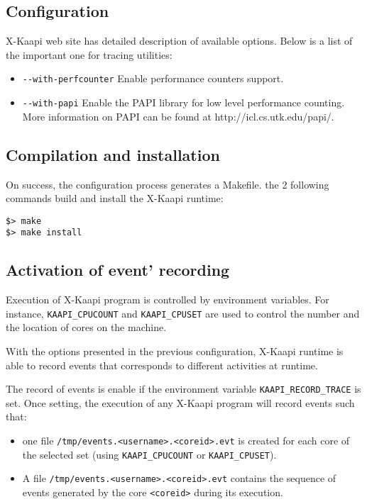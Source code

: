 \documentclass{article}[12pt]
\newcommand{\kaapi}{\textsc{X}-Kaapi\xspace}
\begin{document}
\subsection{Configuration}
\kaapi web site has detailed description of available options. 
Below is a list of the important one for tracing utilities:
\begin{itemize} %
\item \verb+--with-perfcounter+\newline
Enable performance counters support.
\item \verb+--with-papi+\newline
Enable the PAPI library for low level performance counting.
More information on PAPI can be found at http://icl.cs.utk.edu/papi/.
\end{itemize} %

\subsection{Compilation and installation}
On success, the configuration process generates a Makefile. the 2 following
commands build and install the \kaapi runtime:
\begin{verbatim}
$> make
$> make install
\end{verbatim}



\subsection{Activation of event' recording}
Execution of \kaapi program is controlled by environment variables.
For instance, \verb+KAAPI_CPUCOUNT+ and \verb+KAAPI_CPUSET+ are used
to control the number and the location of cores on the machine.

With the options presented in the previous configuration, \kaapi runtime is able to record events that corresponds to different activities at runtime. 

The record of events is enable if the environment variable \verb+KAAPI_RECORD_TRACE+ is set. Once setting, the execution of any \kaapi program will record events such that:
\begin{itemize} 
\item one file \verb+/tmp/events.<username>.<coreid>.evt+ is created for each core of the  selected set (using \verb+KAAPI_CPUCOUNT+ or \verb+KAAPI_CPUSET+). 
\item A file \verb+/tmp/events.<username>.<coreid>.evt+ contains the sequence of events generated by the core \verb+<coreid>+ during its execution. 
\end{itemize} 
\end{document}
